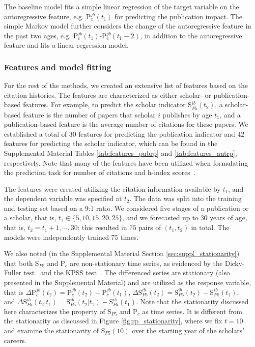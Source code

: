 The baseline model fits a simple linear regression of the target variable on the autoregressive feature, e.g. P$_c^{jb}(t_1)$ for predicting the publication impact. The simple Markov model further considers the change of the autoregressive feature in the past two ages, e.g. P$_c^{jb}(t_1)$-P$_c^{jb}(t_1-2)$, in addition to the autoregressive feature and fits a linear regression model. 

\subsubsection*{Features and model fitting}

For the rest of the methods, we created an extensive list of features based on the citation histories. The features are characterized as either scholar- or publication-based features. For example, to predict the scholar indicator S$_{P5}^{ib}(t_2)$, a scholar-based feature is the number of papers that scholar $i$ publishes by age $t_1$, and a publication-based feature is the average number of citations for these papers. We established a total of $30$ features for predicting the publication indicator and $42$ features for predicting the scholar indicator, which can be found in the Supplemental Material Tables \ref{tab:features_pubrp} and \ref{tab:features_autrp}, respectively. Note that many of the features have been utilized when formulating the prediction task for number of citations and h-index scores~\cite{acuna2012future,weihs2017learning}.

The features were created utilizing the citation information available by $t_1$, and the dependent variable was specified at $t_2$. The data was split into the training and testing set based on a 9:1 ratio. We considered five stages of a publication or a scholar, that is, $t_1\in\{5,10,15,20,25\}$, and we forecasted up to $30$ years of age, that is, $t_2=t_1+1,\cdots,30$; this resulted in $75$ pairs of $(t_1,t_2)$ in total. The models were independently trained $75$ times. 

We also noted (in the Supplemental Material Section \ref{sec:suppl_stationarity}) that both S$_{P5}$ and P$_c$ are non-stationary time series, as evidenced by the Dicky-Fuller test~\cite{dickey1979distribution} and the KPSS test~\cite{kwiatkowski1992testing}. The differenced series are stationary (also presented in the Supplemental Material) and are utilized as the response variable, that is $\Delta \text{P}_{c}^{jb}(t_2) = \text{P}_{c}^{jb}(t_2) - \text{P}_{c}^{jb}(t_1)$, $\Delta \text{S}_{P5}^{ib}(t_2) = \text{S}_{P5}^{ib}(t_2) - \text{S}_{P5}^{ib}(t_1)$, and $\Delta \text{S}_{P5}^{ib}(t_2|t_1) = \text{S}_{P5}^{ib}(t_2|t_1) - \text{S}_{P5}^{ib}(t_1)$. Note that the stationarity discussed here characterizes the property of S$_{P5}$ and P$_c$ as time series. It is different from the stationarity as discussed in Figure \ref{fig:rp_stationarity}, where we fix $t=10$ and examine the stationarity of S$_{P5}(10)$ over the starting year of the scholars' careers.

